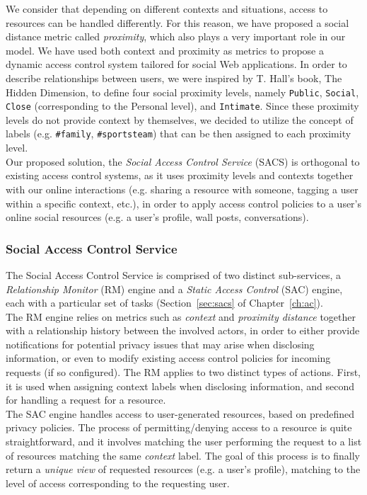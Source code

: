 We consider that depending on different contexts and situations, access to resources can be handled differently. For this reason, we have proposed a social distance metric called \textit{proximity}, which also plays a very important role in our model. We have used both context and proximity as metrics to propose a dynamic access control system tailored for social Web applications. In order to describe relationships between users, we were inspired by T. Hall's book, The Hidden Dimension\cite{edward1966hall}, to define four social proximity levels, namely \verb+Public+, \verb+Social+, \verb+Close+ (corresponding to the Personal level), and \verb+Intimate+. Since these proximity levels do not provide context by themselves, we decided to utilize the concept of labels (e.g. \verb+#family+, \verb+#sportsteam+) that can be then assigned to each proximity level.\\

Our proposed solution, the \textit{Social Access Control Service} (SACS) is orthogonal to existing access control systems, as it uses proximity levels and contexts together with our online interactions (e.g. sharing a resource with someone, tagging a user within a specific context, etc.), in order to apply access control policies to a user's online social resources (e.g. a user's profile, wall posts, conversations).

\subsubsection{Social Access Control Service}
The Social Access Control Service is comprised of two distinct sub-services, a \textit{Relationship Monitor} (RM) engine and a \textit{Static Access Control} (SAC) engine, each with a particular set of tasks (Section~\ref{sec:sacs} of Chapter~\ref{ch:ac}).\\

The RM engine relies on metrics such as \textit{context} and \textit{proximity distance} together with a relationship history between the involved actors, in order to either provide notifications for potential privacy issues that may arise when disclosing information, or even to modify existing access control policies for incoming requests (if so configured). The RM applies to two distinct types of actions. First, it is used when assigning context labels when disclosing information, and second for handling a request for a resource.\\

The SAC engine handles access to user-generated resources, based on predefined privacy policies. The process of permitting/denying access to a resource is quite straightforward, and it involves matching the user performing the request to a list of resources matching the same \textit{context} label. The goal of this process is to finally return a \textit{unique view} of requested resources (e.g. a user's profile), matching to the level of access corresponding to the requesting user.\\

